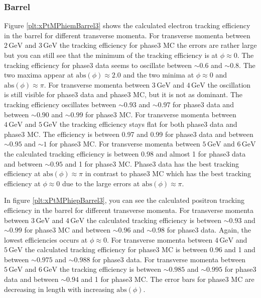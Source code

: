 \documentclass[a4paper,11pt,twosided,final,german,openbib,pdftex,listof=totoc,bibliography=totoc]{scrbook}
\begin{document}
\newpage
\subsubsection{Barrel}


Figure \ref{plt:xPtMPhiemBarrel3} shows the calculated electron tracking efficiency in the barrel for different transverse momenta.
For transverse momenta between $2\,\textrm{GeV}$ and $3\,\textrm{GeV}$ the tracking efficiency for phase3 MC the errors are rather large but you can still see that the minimum of the tracking efficiency is at $\phi \approx 0$. The tracking efficiency for phase3 data seems to oscillate between $\sim 0.6$ and $\sim 0.8$. The two maxima appear at $\textrm{abs}(\phi) \approx 2.0$ and the two minima at $\phi \approx 0$ and $\textrm{abs}(\phi) \approx \pi$.
For transverse momenta between $3\,\textrm{GeV}$ and $4\,\textrm{GeV}$ the oscillation is still visible for phase3 data and phase3 MC, but it is not as dominant. The tracking efficiency oscillates between $\sim 0.93$ and  $\sim 0.97$ for phase3 data and between $\sim 0.90$ and $\sim 0.99$ for phase3 MC.
For transverse momenta between $4\,\textrm{GeV}$ and $5\,\textrm{GeV}$ the tracking efficiency stays flat for both phase3 data and phase3 MC. The efficiency is between 0.97 and 0.99 for phase3 data and between $\sim 0.95$ and $\sim 1$ for phase3 MC.
For transverse momenta between $5\,\textrm{GeV}$ and $6\,\textrm{GeV}$ the calculated tracking efficiency is between 0.98 and almost 1 for phase3 data and between $\sim 0.95$ and 1 for phase3 MC. Phase3 data has the best tracking efficiency at $\textrm{abs}(\phi) \approx \pi$ in contrast to phase3 MC which has the best tracking efficiency at $\phi \approx 0$ due to the large errors at $\textrm{abs}(\phi) \approx \pi$. 

In figure \ref{plt:xPtMPhiepBarrel3}, you can see the calculated positron tracking efficiency in the barrel for different transverse momenta.
For transverse momenta between $3\,\textrm{GeV}$ and $4\,\textrm{GeV}$ the calculated tracking efficiency is between $\sim 0.93$ and $\sim 0.99$ for phase3 MC and between $\sim 0.96$ and $\sim 0.98$ for phase3 data. Again, the lowest efficiencies occurs at $\phi \approx 0$.
For transverse momenta between $4\,\textrm{GeV}$ and $5\,\textrm{GeV}$ the calculated tracking efficiency for phase3 MC is between 0.96 and 1 and between $\sim 0.975$ and $\sim 0.988$ for phase3 data. 
For transverse momenta between $5\,\textrm{GeV}$ and $6\,\textrm{GeV}$ the tracking efficiency is between $\sim 0.985$ and $\sim 0.995$ for phase3 data and between $\sim 0.94$ and 1 for phase3 MC. The error bars for phase3 MC are decreasing in length with increasing $\textrm{abs}(\phi)$.
\end{document}
